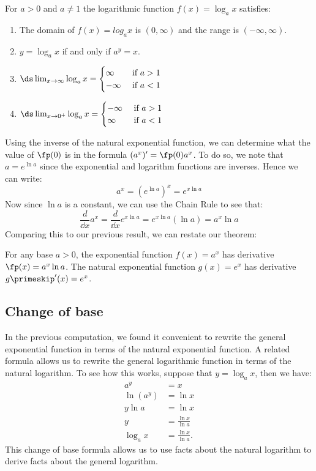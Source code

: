 \begin{keyidea}\label{ki_log_func_props}%
For $a>0$ and $a\ne1$ the logarithmic function $f(x)=\log_a x$ satisfies:
\begin{enumerate}
\item The domain of $f(x)=log_a x$ is $(0,\infty)$ and the range is $(-\infty,\infty)$.
\item $y=\log_a x$ if and only if $a^y=x$.
\item $\ds\lim_{x\to\infty}\log_a x=
\begin{cases}\infty&\text{ if $a>1$}\\ -\infty&\text{ if $a<1$}\end{cases}$
\item $\ds\lim_{x\to0^+}\log_a x=\begin{cases}-\infty&\text{ if $a>1$}\\\infty&\text{ if $a<1$}\end{cases}$
\end{enumerate}
\end{keyidea}

Using the inverse of the natural exponential function, we can determine what the value of $\fp(0)$ is in the formula $(a^x)'=\fp(0)a^x$. To do so, we note that $a=e^{\ln a}$ since the exponential and logarithm functions are inverses. Hence we can write:
\[a^x=\left(e^{\ln a}\right)^x=e^{x\ln a}\]
Now since $\ln a$ is a constant, we can use the Chain Rule to see that:
\[\frac d{\dd x} a^x=\frac d{\dd x} e^{x\ln a} =e^{x\ln a}(\ln a) =a^x\ln a\]
Comparing this to our previous result, we can restate our theorem:

\begin{theorem}\label{thm_exp_deriv}%
For any base $a>0$, the exponential function $f(x)=a^x$ has derivative $\fp(x)=a^x\ln a$. The natural exponential function $g(x)=e^x$ has derivative $g\primeskip'(x)=e^x$.
\end{theorem}

\subsection{Change of base}

In the previous computation, we found it convenient to rewrite the general exponential function in terms of the natural exponential function. A related formula allows us to rewrite the general logarithmic function in terms of the natural logarithm.  To see how this works, suppose that $y=\log_ax$, then we have:
\begin{align*}
a^y&=x \\
\ln(a^y)&=\ln x\\
y\ln a&=\ln x\\
y&=\frac{\ln x}{\ln a}\\
\log_a x&=\frac{\ln x}{\ln a}.
\end{align*}
This change of base formula allows us to use facts about the natural logarithm to derive facts about the general logarithm.

